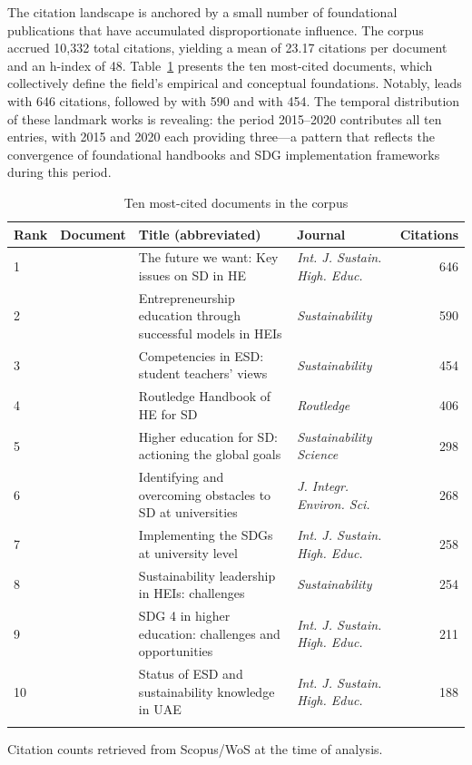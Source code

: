 \documentclass[pdflatex,sn-basic]{sn-jnl}%
\begin{document}
The citation landscape is anchored by a small number of foundational publications that have accumulated disproportionate influence. The corpus accrued 10,332 total citations, yielding a mean of 23.17 citations per document and an h-index of 48. Table~\ref{tab:most_cited} presents the ten most-cited documents, which collectively define the field's empirical and conceptual foundations. Notably, \cite{filho_future_2015} leads with 646 citations, followed by \cite{boldureanu_entrepreneurship_2020} with 590 and \cite{cebrian_competencies_2015} with 454. The temporal distribution of these landmark works is revealing: the period 2015--2020 contributes all ten entries, with 2015 and 2020 each providing three---a pattern that reflects the convergence of foundational handbooks and SDG implementation frameworks during this period.

\begin{table}[htbp]
\centering
\caption{Ten most-cited documents in the corpus}\label{tab:most_cited}

\begin{tabular*}{\textwidth}{p{0.8cm}p{2.5cm}p{3.5cm}p{2.8cm}r}
\toprule
\textbf{Rank} & \textbf{Document} & \textbf{Title (abbreviated)} & \textbf{Journal} & \textbf{Citations} \\
\midrule
1 & \cite{filho_future_2015} & The future we want: Key issues on SD in HE & \textit{Int. J. Sustain. High. Educ.} & 646 \\
2 & \cite{boldureanu_entrepreneurship_2020} & Entrepreneurship education through successful models in HEIs & \textit{Sustainability} & 590 \\
3 & \cite{cebrian_competencies_2015} & Competencies in ESD: student teachers' views & \textit{Sustainability} & 454 \\
4 & \cite{barth_routledge_2015} & Routledge Handbook of HE for SD & \textit{Routledge} & 406 \\
5 & \cite{b_franco_higher_2019} & Higher education for SD: actioning the global goals & \textit{Sustainability Science} & 298 \\
6 & \cite{filho_identifying_2017} & Identifying and overcoming obstacles to SD at universities & \textit{J. Integr. Environ. Sci.} & 268 \\
7 & \cite{albareda-tiana_implementing_2018} & Implementing the SDGs at university level & \textit{Int. J. Sustain. High. Educ.} & 258 \\
8 & \cite{filho_sustainability_2020} & Sustainability leadership in HEIs: challenges & \textit{Sustainability} & 254 \\
9 & \cite{ferguson_sdg_2020} & SDG 4 in higher education: challenges and opportunities & \textit{Int. J. Sustain. High. Educ.} & 211 \\
10 & \cite{al-naqbi_status_2018} & Status of ESD and sustainability knowledge in UAE & \textit{Int. J. Sustain. High. Educ.} & 188 \\
\botrule
\end{tabular*}
\begin{tablenotes}
\item Citation counts retrieved from Scopus/WoS at the time of analysis.
\end{tablenotes}
\end{table}
\end{document}
